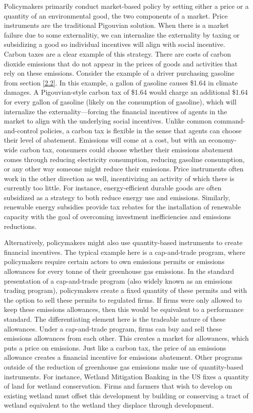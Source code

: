Policymakers primarily conduct market-based policy by setting either a price or a quantity of an environmental good, the two components of a market. Price instruments are the traditional Pigouvian solution. When there is a market failure due to some externalitiy, we can internalize the externality by taxing or subsidizing a good so individual incentives will align with social incentive. Carbon taxes are a clear example of this strategy. There are costs of carbon dioxide emissions that do not appear in the prices of goods and activities that rely on these emissions. Consider the example of a driver purchasing gasoline from section \ref{2.2}. In this example, a gallon of gasoline causes \$1.64 in climate damages. A Pigouvian-style carbon tax of \$1.64 would charge an additional \$1.64 for every gallon of gasoline (likely on the consumption of gasoline), which will internalize the externality---forcing the financial incentives of agents in the market to align with the underlying social incentives. Unlike common command-and-control policies, a carbon tax is flexible in the sense that agents can choose their level of abatement. Emissions will come at a cost, but with an economy-wide carbon tax, consumers could choose whether their emissions abatement comes through reducing electricity consumption, reducing gasoline consumption, or any other way someone might reduce their emissions. Price instruments often work in the other direction as well, incentivizing an activity of which there is currently too little. For instance, energy-efficient durable goods are often subsidized as a strategy to both reduce energy use and emissions. Similarly, renewable energy subsidies provide tax rebates for the installation of renewable capacity with the goal of overcoming investment inefficiencies and emissions reductions. 

Alternatively, policymakers might also use quantity-based instruments to create financial incentives. The typical example here is a cap-and-trade program, where policymakers require certain actors to own emissions permits or emissions allowances for every tonne of their greenhouse gas emissions. In the standard presentation of a cap-and-trade program (also widely known as an emissions trading program), policymakers create a fixed quantity of these permits and with the option to sell these permits to regulated firms. If firms were only allowed to keep these emissions allowances, then this would be equivalent to a performance standard. The differentiating element here is the tradeable nature of these allowances. Under a cap-and-trade program, firms can buy and sell these emissions allowances from each other. This creates a market for allowances, which puts a price on emissions. Just like a carbon tax, the price of an emissions allowance creates a financial incentive for emissions abatement. Other programs outside of the reduction of greenhouse gas emissions make use of quantity-based instruments. For instance, Wetland Mitigation Banking in the US fixes a quantity of land for wetland conservation. Firms and farmers that wish to develop on existing wetland must offset this development by building or conserving a tract of wetland equivalent to the wetland they displace through development. 

